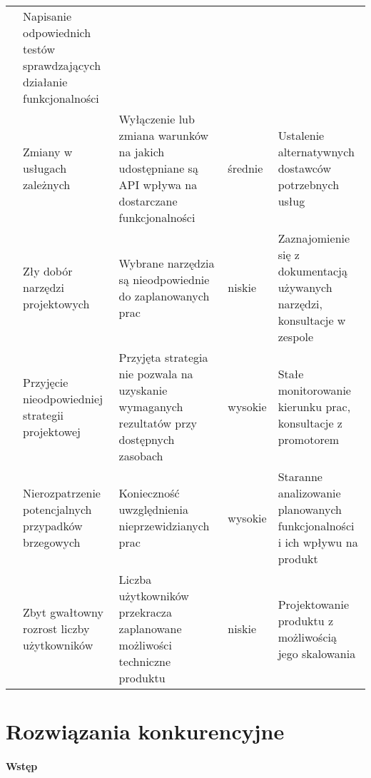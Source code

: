 \begin{longtable}{|p{.1\linewidth}|p{}|p{}|p{}|p{}|}
    & Napisanie odpowiednich testów sprawdzających działanie funkcjonalności \\
    \cline{2-5}
    & Zmiany w usługach zależnych & Wyłączenie lub zmiana warunków na jakich udostępniane są API wpływa na dostarczane funkcjonalności & średnie
    & Ustalenie alternatywnych dostawców potrzebnych usług \\
    \cline{2-5}
    & Zły dobór narzędzi projektowych & Wybrane narzędzia są nieodpowiednie do zaplanowanych prac & niskie
    & Zaznajomienie się z dokumentacją używanych narzędzi, konsultacje w zespole \\
    \hline
    \pagebreak
    \hline
    \multirow{2}{=}{\parbox[c]{3.5cm}{}} & Przyjęcie nieodpowiedniej strategii projektowej & Przyjęta strategia nie pozwala na uzyskanie wymaganych rezultatów przy dostępnych zasobach & wysokie
    & Stałe monitorowanie kierunku prac, konsultacje z promotorem \\
    \cline{2-5}
    & Nierozpatrzenie potencjalnych przypadków brzegowych & Konieczność uwzględnienia nieprzewidzianych prac & wysokie
    & Staranne analizowanie planowanych funkcjonalności i ich wpływu na produkt \\
    \hline
    \multirow{1}{=}{\parbox[c]{3.5cm}{}}& Zbyt gwałtowny rozrost liczby użytkowników & Liczba użytkowników przekracza zaplanowane możliwości techniczne produktu & niskie
    & Projektowanie produktu z możliwością jego skalowania \\
    \hline

\end{longtable}
\pagebreak
\section{Rozwiązania konkurencyjne}
\label{sec:rozwiazania-konkurencyjne}

\paragraph{Wstęp}

